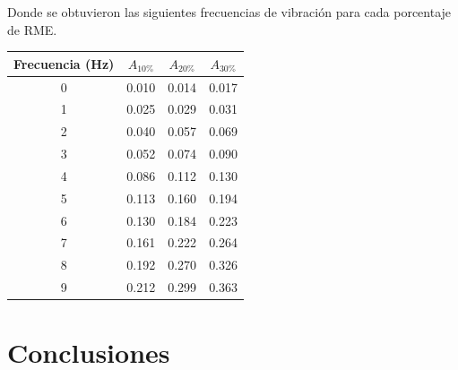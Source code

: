 Donde se obtuvieron las siguientes frecuencias de vibración para cada porcentaje de RME.

\begin{table}[H]
    \centering
    \begin{tabular}{cccc}
    \toprule
     Frecuencia (Hz) & $A_{10\%}$ & $A_{20\%}$ & $A_{30\%}$ \\
    \midrule
     0 &       0.010 &       0.014 &       0.017 \\
     1 &       0.025 &       0.029 &       0.031 \\
     2 &       0.040 &       0.057 &       0.069 \\
     3 &       0.052 &       0.074 &       0.090 \\
     4 &       0.086 &       0.112 &       0.130 \\
     5 &       0.113 &       0.160 &       0.194 \\
     6 &       0.130 &       0.184 &       0.223 \\
     7 &       0.161 &       0.222 &       0.264 \\
     8 &       0.192 &       0.270 &       0.326 \\
     9 &       0.212 &       0.299 &       0.363 \\
    \bottomrule
    \end{tabular}
\end{table}



\section{Conclusiones}